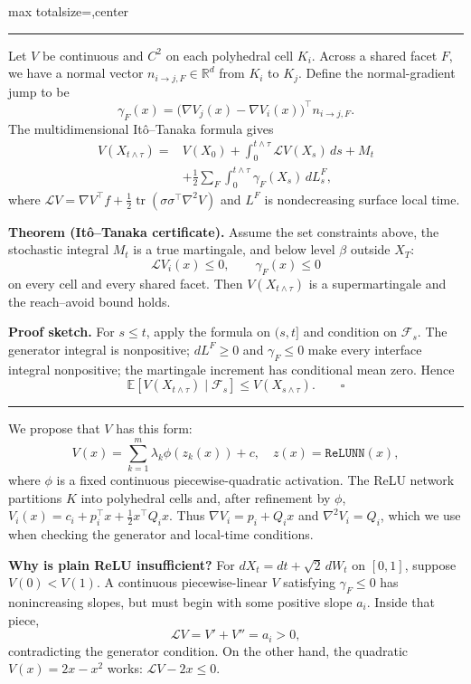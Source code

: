 \documentclass[10pt]{article}
\newcommand{\titlefont}{\bfseries}
\newcommand{\postersection}[1]{%
  \vspace{1.1mm}{\raggedright\fontsize{16}{18}\selectfont\titlefont
  \textcolor{AccentDark}{#1}\par}\vspace{.45mm}
  \textcolor{Rule}{\rule{\linewidth}{0.7pt}}\vspace{.7mm}}
\newcommand{\postersubsection}[1]{%
  \vspace{.7mm}{\fontsize{12.2}{13.5}\selectfont\titlefont #1}\par\vspace{.2mm}}
\begin{document}
\begin{adjustbox}{max totalsize={\textwidth}{\textheight},center}
\begin{minipage}{\textwidth}
\begin{minipage}[t]{.322\textwidth}
\postersection{RQ1: Validity of non-$C^2$ certificates}
Let $V$ be continuous and $C^2$ on each polyhedral cell $K_i$. Across a shared
facet $F$, we have a normal vector $n_{i\to j,F} \in \mathbb{R}^d$ from $K_i$ to $K_j$. 
Define the normal-gradient jump to be
\[
 \gamma_F(x)=\bigl(\nabla V_j(x)-\nabla V_i(x)\bigr)^\top n_{i\to j,F}.
\]
The multidimensional It\^o--Tanaka formula gives
\begin{align*}
 V(X_{t\wedge\tau})={}&V(X_0)
 +\int_0^{t\wedge\tau}\mathcal LV(X_s)\,ds+M_t\\[-1mm]
 &+\frac12\sum_F\int_0^{t\wedge\tau}\gamma_F(X_s)\,dL_s^F,
\end{align*}
where
$ \mathcal LV=\nabla V^\top f+\tfrac12
 \operatorname{tr}(\sigma\sigma^\top\nabla^2V)$ and $L^F$ is nondecreasing surface local time.

\begin{theorembox}
\textbf{Theorem (It\^o--Tanaka certificate).}
Assume the set constraints above, the stochastic integral $M_t$ is a true
martingale, and below level $\beta$ outside $X_T$:
\[
 \mathcal LV_i(x)\leq0,\qquad \gamma_F(x)\leq0
\]
on every cell and every shared facet. Then $V(X_{t\wedge\tau})$ is a
supermartingale and the reach--avoid bound holds.
\end{theorembox}

\textbf{Proof sketch.} For $s\leq t$, apply the formula on $(s,t]$ and
condition on $\mathcal F_s$. The generator integral is nonpositive;
$dL^F\geq0$ and $\gamma_F\leq0$ make every interface integral nonpositive;
the martingale increment has conditional mean zero. Hence
\[
 \mathbb E[V(X_{t\wedge\tau})\mid\mathcal F_s]
 \leq V(X_{s\wedge\tau}).\qquad\square
\]

\end{minipage}\hfill
\begin{minipage}[t]{.322\textwidth}
\vspace{0pt}
\postersection{RQ2: A useful class of non-$C^2$ certificates}
\postersubsection{2.1 Piecewise-quadratic structure}
We propose that $V$ has this form:
\[
 V(x)=\sum_{k=1}^m\lambda_k\phi(z_k(x))+c,
 \quad z(x)=\texttt{ReLUNN}(x),
\]
where $\phi$ is a fixed continuous piecewise-quadratic activation. The ReLU
network partitions $K$ into polyhedral cells and, after refinement by $\phi$,
$
 V_i(x)=c_i+p_i^\top x+\tfrac12x^\top Q_i x.
$
Thus $\nabla V_i=p_i+Q_ix$ and $\nabla^2V_i=Q_i$, which we use when checking the
generator and local-time conditions. 
\begin{infobox}
\textbf{Why is plain ReLU insufficient?} For
$dX_t=dt+\sqrt2\,dW_t$ on $[0,1]$, suppose $V(0)<V(1)$. A continuous
piecewise-linear $V$ satisfying $\gamma_F\leq0$ has nonincreasing slopes, but
must begin with some positive slope $a_i$. Inside that piece,
\[
 \mathcal LV=V'+V''=a_i>0,
\]
contradicting the generator condition.
On the other hand, the quadratic $V(x)=2x-x^2$ works:
$\mathcal LV-2x\leq0$.


\end{infobox}
\end{minipage}
\end{minipage}
\end{adjustbox}
\end{document}
